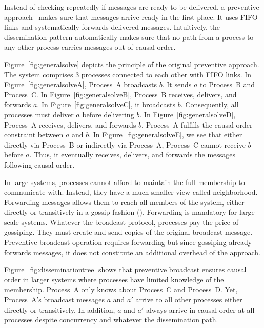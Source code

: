 Instead of checking repeatedly if messages are ready to be delivered, a
preventive approach~\cite{friedman2004causal} makes sure that messages arrive
ready in the first place.  It uses FIFO links and systematically forwards
delivered messages.  Intuitively, the dissemination pattern automatically makes
sure that no path from a process to any other process carries messages out of
causal order.

Figure~\ref{fig:generalsolve} depicts the principle of the original preventive
approach. The system comprises 3 processes connected to each other with FIFO
links.  In Figure~\ref{fig:generalsolveA}, Process~A broadcasts $b$. It sends
$a$ to Process~B and Process~C. In Figure~\ref{fig:generalsolveB}, Process~B
receives, delivers, and forwards $a$. In Figure~\ref{fig:generalsolveC}, it
broadcasts $b$. Consequently, all processes must deliver $a$ before delivering
$b$. In Figure~\ref{fig:generalsolveD}, Process~A receives, delivers, and
forwards $b$. Process~A fulfills the causal order constraint between $a$ and
$b$. In Figure~\ref{fig:generalsolveE}, we see that either directly via
Process~B or indirectly via Process~A, Process~C cannot receive $b$ before
$a$. Thus, it eventually receives, delivers, and forwards the messages following
causal order.


In large systems, processes cannot afford to maintain the full membership to
communicate with. Instead, they have a much smaller view called
neighborhood. Forwarding messages allows them to reach all members of the
system, either directly or transitively in a gossip fashion (\REF). Forwarding
is mandatory for large scale systems.  Whatever the broadcast protocol,
processes pay the price of gossiping. They must create and send copies of the
original broadcast message. Preventive broadcast operation requires forwarding
but since gossiping already forwards messages, it does not constitute an
additional overhead of the approach.

Figure~\ref{fig:disseminationtree} shows that preventive broadcast ensures
causal order in larger systems where processes have limited knowledge of
the membership.  Process~A only knows about Process~C and Process~D.  Yet,
Process~A's broadcast messages $a$ and $a'$ arrive to all other processes either
directly or transitively. In addition, $a$ and $a'$ always arrive in causal
order at all processes despite concurrency and whatever the dissemination path.

